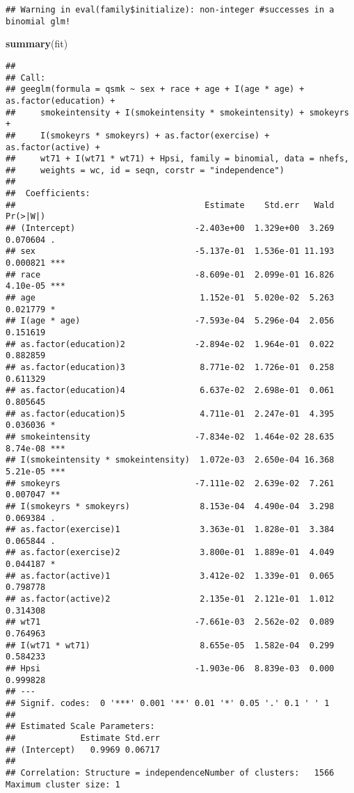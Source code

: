 \documentclass[
  10pt,
]{book}
\newenvironment{Shaded}{\begin{snugshade}}{\end{snugshade}}
\newcommand{\KeywordTok}[1]{\textcolor[rgb]{0.13,0.29,0.53}{\textbf{#1}}}
\newcommand{\NormalTok}[1]{#1}
\begin{document}
\begin{verbatim}
## Warning in eval(family$initialize): non-integer #successes in a binomial glm!
\end{verbatim}

\begin{Shaded}
\begin{Highlighting}[]
\KeywordTok{summary}\NormalTok{(fit)}
\end{Highlighting}
\end{Shaded}

\begin{verbatim}
## 
## Call:
## geeglm(formula = qsmk ~ sex + race + age + I(age * age) + as.factor(education) + 
##     smokeintensity + I(smokeintensity * smokeintensity) + smokeyrs + 
##     I(smokeyrs * smokeyrs) + as.factor(exercise) + as.factor(active) + 
##     wt71 + I(wt71 * wt71) + Hpsi, family = binomial, data = nhefs, 
##     weights = wc, id = seqn, corstr = "independence")
## 
##  Coefficients:
##                                      Estimate    Std.err   Wald Pr(>|W|)    
## (Intercept)                        -2.403e+00  1.329e+00  3.269 0.070604 .  
## sex                                -5.137e-01  1.536e-01 11.193 0.000821 ***
## race                               -8.609e-01  2.099e-01 16.826 4.10e-05 ***
## age                                 1.152e-01  5.020e-02  5.263 0.021779 *  
## I(age * age)                       -7.593e-04  5.296e-04  2.056 0.151619    
## as.factor(education)2              -2.894e-02  1.964e-01  0.022 0.882859    
## as.factor(education)3               8.771e-02  1.726e-01  0.258 0.611329    
## as.factor(education)4               6.637e-02  2.698e-01  0.061 0.805645    
## as.factor(education)5               4.711e-01  2.247e-01  4.395 0.036036 *  
## smokeintensity                     -7.834e-02  1.464e-02 28.635 8.74e-08 ***
## I(smokeintensity * smokeintensity)  1.072e-03  2.650e-04 16.368 5.21e-05 ***
## smokeyrs                           -7.111e-02  2.639e-02  7.261 0.007047 ** 
## I(smokeyrs * smokeyrs)              8.153e-04  4.490e-04  3.298 0.069384 .  
## as.factor(exercise)1                3.363e-01  1.828e-01  3.384 0.065844 .  
## as.factor(exercise)2                3.800e-01  1.889e-01  4.049 0.044187 *  
## as.factor(active)1                  3.412e-02  1.339e-01  0.065 0.798778    
## as.factor(active)2                  2.135e-01  2.121e-01  1.012 0.314308    
## wt71                               -7.661e-03  2.562e-02  0.089 0.764963    
## I(wt71 * wt71)                      8.655e-05  1.582e-04  0.299 0.584233    
## Hpsi                               -1.903e-06  8.839e-03  0.000 0.999828    
## ---
## Signif. codes:  0 '***' 0.001 '**' 0.01 '*' 0.05 '.' 0.1 ' ' 1
## 
## Estimated Scale Parameters:
##             Estimate Std.err
## (Intercept)   0.9969 0.06717
## 
## Correlation: Structure = independenceNumber of clusters:   1566   Maximum cluster size: 1
\end{verbatim}
\end{document}
